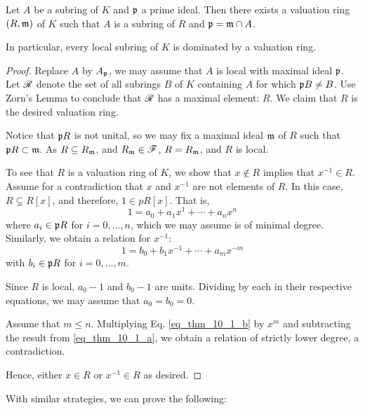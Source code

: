 \begin{thm}\label{mats_val_rng_dom}
Let $A$ be a subring of $K$ and $\mathfrak{p}$ a prime ideal. Then
there exists a valuation ring $(R, \mathfrak{m})$ of $K$ such that 
$A$ is a subring of $R$ and $\mathfrak{p} = \mathfrak{m} \cap A$.

In particular, every local subring of $K$ is dominated by a 
valuation ring.
\end{thm}
\begin{proof}
Replace $A$ by $A_{\mathfrak{p}}$, we may assume \WLOG that $A$ is 
local with maximal ideal $\mathfrak{p}$. Let $\mathscr{R}$ denote the
set of all subrings $B$ of $K$ containing $A$ for which 
$\mathfrak{p}B \neq B$. Use Zorn's Lemma to conclude that 
$\mathscr{R}$ has a maximal element: $R$. We claim that $R$ is the 
desired valuation ring.

Notice that $\mathfrak{p}R$ is not unital, so we may fix a maximal 
ideal $\mathfrak{m}$ of $R$ such that $\mathfrak{p}R \subset \mathfrak{m}$.  
As $R \subseteq R_{\mathfrak{m}}$, and $R_{\mathfrak{m}} \in \mathscr{F}$,
$R = R_{\mathfrak{m}}$, and $R$ is local.

To see that $R$ is a valuation ring of $K$, we show that $x 
\notin R$ implies that $x^{-1} \in R$. Assume for a contradiction
that $x$ and $x^{-1}$ are not elements of $R$. In this case,
$R \subsetneq R[x]$, and therefore, $1 \in pR[x]$. That is,
\begin{equation}\label{eq_thm_10_1_a}
1 = a_0 + a_1x^1 + \cdots + a_nx^n
\end{equation}
where $a_i \in \mathfrak{p}R$ for $i = 0,\dots, n$, which we may 
assume is of minimal degree. Similarly, we obtain a relation for 
$x^{-1}$:
\begin{equation}\label{eq_thm_10_1_b}
1 = b_0 + b_1x^{-1} + \cdots + a_mx^{-m}
\end{equation}
with $b_i \in \mathfrak{p}R$ for $i = 0,\dots, m$.

Since $R$ is local, $a_0 - 1$ and $b_0 - 1$ are units. Dividing
by each in their respective equations, we may assume that $a_0 = 
b_0 = 0$.

Assume \WLOG that $m \leq n$. Multiplying Eq. \ref{eq_thm_10_1_b} 
by $x^m$ and subtracting the result from \ref{eq_thm_10_1_a}, we 
obtain a relation of strictly lower degree, a contradiction.

Hence, either $x \in R$ or $x^{-1} \in R$ as desired.
\end{proof}

With similar strategies, we can prove the following:
